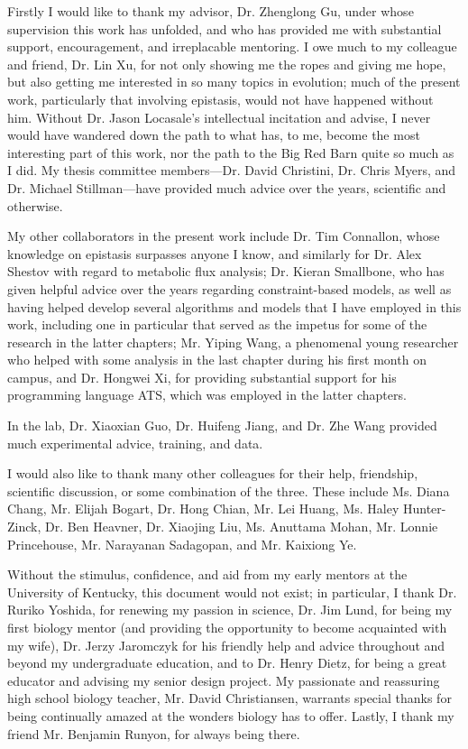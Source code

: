 \documentclass[phd,tocprelim]{cornell}
\begin{document}
\begin{acknowledgements}
Firstly I would like to thank my advisor, Dr. Zhenglong Gu, under
whose supervision this work has unfolded, and who has provided me with
substantial support, encouragement, and irreplacable mentoring. I owe
much to my colleague and friend, Dr. Lin Xu, for not only showing me
the ropes and giving me hope, but also getting me interested in so
many topics in evolution; much of the present work, particularly that
involving epistasis, would not have happened without him. Without
Dr. Jason Locasale's intellectual incitation and advise, I never would
have wandered down the path to what has, to me, become the most
interesting part of this work, nor the path to the Big Red Barn quite
so much as I did. My thesis committee members---Dr. David Christini,
Dr. Chris Myers, and Dr. Michael Stillman---have provided much advice
over the years, scientific and otherwise.

My other collaborators in the present work include Dr. Tim Connallon,
whose knowledge on epistasis surpasses anyone I know, and similarly
for Dr. Alex Shestov with regard to metabolic flux analysis;
Dr. Kieran Smallbone, who has given helpful advice over the years 
regarding constraint-based models, as well as having helped develop several  
algorithms and models that I have employed in this work, including one in 
particular that served as the impetus for some of the research in the latter 
chapters; Mr. Yiping Wang, a phenomenal young researcher who helped
with some analysis in the last chapter during his first month on
campus, and Dr. Hongwei Xi, for providing substantial support for his
programming language ATS, which was employed in the latter chapters.

In the lab, Dr. Xiaoxian Guo, Dr. Huifeng Jiang, and Dr. Zhe Wang
provided much experimental advice, training, and data.

I would also like to thank many other colleagues for their help,
friendship, scientific discussion, or some combination of
the three. These include Ms. Diana Chang, Mr. Elijah Bogart, 
Dr. Hong Chian, Mr. Lei Huang,
Ms. Haley Hunter-Zinck, Dr. Ben Heavner, Dr. Xiaojing Liu, Ms. Anuttama Mohan,
Mr. Lonnie Princehouse, Mr. Narayanan Sadagopan, and Mr. Kaixiong Ye.

Without the stimulus, confidence, and aid from my early mentors at the
University of Kentucky, this document would not exist; in particular,
I thank Dr. Ruriko Yoshida, for renewing my passion in science,
Dr. Jim Lund, for being my first biology mentor (and providing the
opportunity to become acquainted with my wife), Dr. Jerzy Jaromczyk
for his friendly help and advice throughout and beyond my
undergraduate education, and to Dr. Henry Dietz, for being a great
educator and advising my senior design project.  My passionate and
reassuring high school biology teacher, Mr. David Christiansen,
warrants special thanks for being continually amazed at the wonders
biology has to offer. Lastly, I thank my friend Mr. Benjamin Runyon,
for always being there.
\end{acknowledgements}
\end{document}
